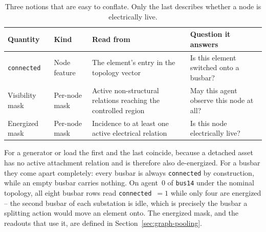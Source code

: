 {\begin{table}[H]
  \centering
  \small
  \caption{Three notions that are easy to conflate. Only the last describes
  whether a node is electrically live.}
  \label{tab:connected-vs-energized}
  \setlength{\tabcolsep}{5pt}
  \begin{tabular}{L{0.20\textwidth}L{0.16\textwidth}L{0.26\textwidth}L{0.28\textwidth}}
    \toprule
    Quantity & Kind & Read from & Question it answers \\
    \midrule
    \texttt{connected} & Node feature & The element's entry in the topology
    vector & Is this element switched onto a busbar? \\
    Visibility mask & Per-node mask & Active non-structural relations reaching
    the controlled region & May this agent observe this node at all? \\
    Energized mask & Per-node mask & Incidence to at least one active
    electrical relation & Is this node electrically live? \\
    \bottomrule
  \end{tabular}
\end{table}

For a generator or load the first and the last coincide, because a detached
asset has no active attachment relation and is therefore also de-energized. For
a busbar they come apart completely: every busbar is always \texttt{connected}
by construction, while an empty busbar carries nothing. On agent~$0$ of
\texttt{bus14} under the nominal topology, all eight busbar rows read
\texttt{connected}~$=1$ while only four are energized -- the second busbar of
each substation is idle, which is precisely the busbar a splitting action would
move an element onto. The energized mask, and the readouts that use it, are
defined in Section~\ref{sec:graph-pooling}.

}

